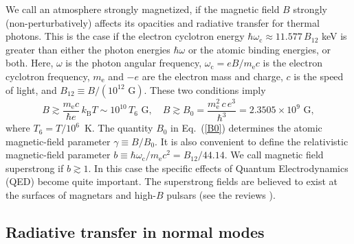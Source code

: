 \documentclass{pos1}
\newcommand{\beq}{\begin{equation}}
\newcommand{\eeq}{\end{equation}}
\newcommand{\req}[1]{Eq.~(\ref{#1})}
\newcommand{\kB}{k_\mathrm{B}}
\newcommand{\mel}{m_\mathrm{e}}
\newcommand{\omc}{\omega_\mathrm{c}}
\begin{document}
We call an atmosphere strongly magnetized, if the magnetic field $B$
strongly (non-perturbatively) affects its opacities and radiative
transfer for thermal photons. This is the case if the electron
cyclotron energy $ \hbar\omc \approx 11.577\,B_{12}$ keV is
greater than either the photon energies $\hbar\omega$ or the atomic
binding energies, or both. Here,
$\omega$ is the photon angular frequency, $\omc=eB/\mel c$ is the
electron cyclotron frequency, $\mel$ and $-e$ are the electron mass
and charge, $c$ is the speed of light, and $B_{12}\equiv
B/(10^{12}\mbox{~G})$.
These two conditions imply
\beq
 B\gtrsim \frac{\mel c }{ \hbar e}\,\kB T \sim 10^{10}\,
    T_6\mbox{~G},
\quad
  B\gtrsim
   B_0 = \frac{\mel^2\,c\,e^3}{\hbar^3} =
   2.3505\times10^9\mbox{~G},
\label{B0}
\eeq
where $T_6 = T/10^6$~K.
The quantity $B_0$ in \req{B0} determines the atomic magnetic-field
parameter $\gamma\equiv B/B_0$. It is also convenient to define the
relativistic  magnetic-field parameter $b\equiv\hbar\omc/\mel c^2 =
B_{12}/44.14$. We call magnetic field superstrong if $b
\gtrsim 1$. In this case the specific effects of Quantum
Electrodynamics (QED) become quite important. The superstrong fields
are believed to exist at the surfaces of magnetars and high-$B$
pulsars (see the
reviews \cite{OlausenKaspi,Mereghetti_ea15,Turolla_ea15}).

\subsection{Radiative transfer in normal modes}
\label{sec:RT}
\end{document}
